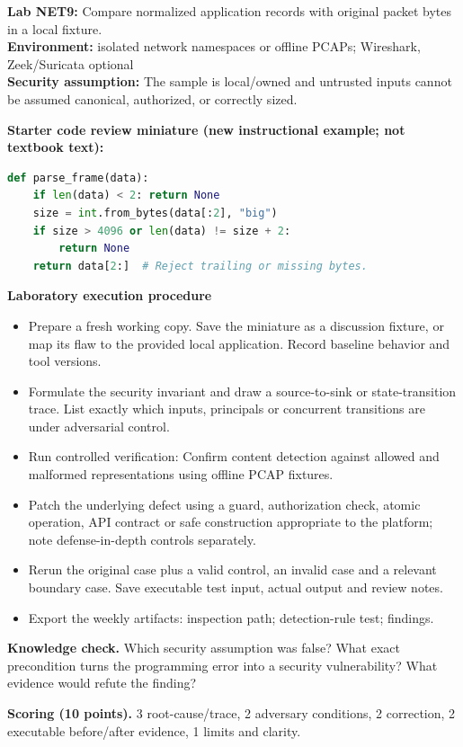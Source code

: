 \documentclass[10pt,letterpaper]{article}
\begin{document}
\begin{insight}\textbf{Lab NET9:} Compare normalized application records with original packet bytes in a local fixture.\\\textbf{Environment:} isolated network namespaces or offline PCAPs; Wireshark, Zeek/Suricata optional\\\textbf{Security assumption:} The sample is local/owned and untrusted inputs cannot be assumed canonical, authorized, or correctly sized.\end{insight}
\textbf{Starter code review miniature (new instructional example; not textbook text):}
\begin{lstlisting}[language=Python]
def parse_frame(data):
    if len(data) < 2: return None
    size = int.from_bytes(data[:2], "big")
    if size > 4096 or len(data) != size + 2:
        return None
    return data[2:]  # Reject trailing or missing bytes.
\end{lstlisting}
\textbf{Laboratory execution procedure}
\begin{itemize}[leftmargin=*,itemsep=2pt]
\item Prepare a fresh working copy. Save the miniature as a discussion fixture, or map its flaw to the provided local application. Record baseline behavior and tool versions.
\item Formulate the security invariant and draw a source-to-sink or state-transition trace. List exactly which inputs, principals or concurrent transitions are under adversarial control.
\item Run controlled verification: Confirm content detection against allowed and malformed representations using offline PCAP fixtures.
\item Patch the underlying defect using a guard, authorization check, atomic operation, API contract or safe construction appropriate to the platform; note defense-in-depth controls separately.
\item Rerun the original case plus a valid control, an invalid case and a relevant boundary case. Save executable test input, actual output and review notes.
\item Export the weekly artifacts: inspection path; detection-rule test; findings.
\end{itemize}
\textbf{Knowledge check.} Which security assumption was false? What exact precondition turns the programming error into a security vulnerability? What evidence would refute the finding?

\textbf{Scoring (10 points).} 3 root-cause/trace, 2 adversary conditions, 2 correction, 2 executable before/after evidence, 1 limits and clarity.
\end{document}
